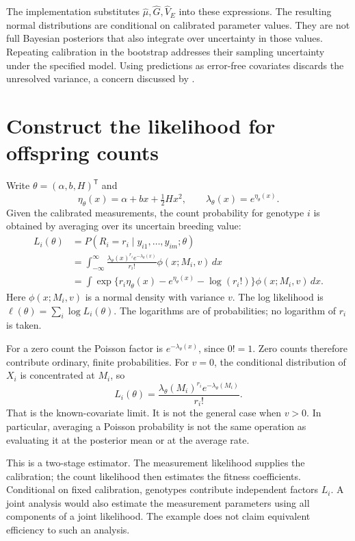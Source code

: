 The implementation substitutes \(\widehat\mu,\widehat G,\widehat V_E\) into
these expressions. The resulting normal distributions are conditional on
calibrated parameter values. They are not full Bayesian posteriors that also
integrate over uncertainty in those values. Repeating calibration in the
bootstrap addresses their sampling uncertainty under the specified model.
Using predictions as error-free covariates discards the unresolved variance,
a concern discussed by \citet{HadfieldEtAl2010}.

\section{Construct the likelihood for offspring counts}
\label{estimation:likelihood}

Write \(\theta=(\alpha,b,H)^{\mathsf T}\) and
\[
 \eta_\theta(x)=\alpha+bx+\tfrac12Hx^2,\qquad
 \lambda_\theta(x)=e^{\eta_\theta(x)}.
\]
Given the calibrated measurements, the count probability for genotype \(i\)
is obtained by averaging over its uncertain breeding value:
\begin{align}
 L_i(\theta)
 &=P(R_i=r_i\mid y_{i1},\ldots,y_{im};\theta)\nonumber\\
 &=\int_{-\infty}^{\infty}
   \frac{\lambda_\theta(x)^{r_i}e^{-\lambda_\theta(x)}}{r_i!}
   \phi(x;M_i,v)\,dx\nonumber\\
 &=\int
   \exp\{r_i\eta_\theta(x)-e^{\eta_\theta(x)}
                  -\log(r_i!)\}\phi(x;M_i,v)\,dx.
 \label{estimation:mixture_likelihood}
\end{align}
Here \(\phi(x;M_i,v)\) is a normal density with variance \(v\). The log likelihood
is \(\ell(\theta)=\sum_i\log L_i(\theta)\). The logarithms are of
probabilities; no logarithm of \(r_i\) is taken.

For a zero count the Poisson factor is \(e^{-\lambda_\theta(x)}\), since
\(0!=1\). Zero counts therefore contribute ordinary, finite probabilities.
For \(v=0\), the conditional distribution of \(X_i\) is concentrated at
\(M_i\), so
\[
 L_i(\theta)
 =\frac{\lambda_\theta(M_i)^{r_i}
           e^{-\lambda_\theta(M_i)}}{r_i!}.
\]
That is the known-covariate limit. It is not the general case when \(v>0\).
In particular, averaging a Poisson probability is not the same operation as
evaluating it at the posterior mean or at the average rate.

This is a two-stage estimator. The measurement likelihood supplies the
calibration; the count likelihood then estimates the fitness coefficients.
Conditional on fixed calibration, genotypes contribute independent factors
\(L_i\). A joint analysis would also estimate the measurement parameters using
all components of a joint likelihood. The example does not claim equivalent
efficiency to such an analysis.

